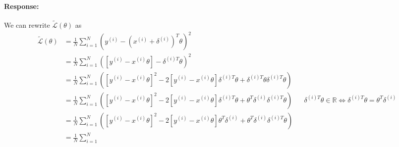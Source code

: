 \documentclass{article}
\newcommand{\R}{\mathbb{R}}
\newenvironment{response}{\begin{responseframe}\vspace{-10pt}\paragraph{Response:}}{\end{responseframe}}
\begin{document}
\begin{enumerate}
\begin{enumerate}
                    \begin{adjustwidth}{-7.7em}{-3em}
                        \begin{response}
                            We can rewrite $\tilde{\mathcal{L}} (\theta)$ as
                            \begin{align*}
                                \tilde{\mathcal{L}} (\theta) 
                            &= \frac{1}{N}
                            \sum^{N}_{i = 1} 
                            \left( y^{(i)} - \left( x^{(i)} + \delta^{(i)} \right)^T \theta \right)^2 \\
                            &= \frac{1}{N} 
                            \sum^{N}_{i = 1} 
                            \left( \left[y^{(i)} - x^{(i)} \theta \right] - \delta^{(i)T} \theta \right)^2 \\
                            &= \frac{1}{N} 
                            \sum^{N}_{i = 1} 
                            \left( 
                                \left[ y^{(i)} - x^{(i)} \theta \right]^2
                                -
                                2\left[ y^{(i)} - x^{(i)} \theta \right] \delta^{(i)T} \theta 
                                + 
                                \delta^{(i)T} \theta \delta^{(i)T} \theta 
                            \right) \\
                            &= \frac{1}{N} 
                            \sum^{N}_{i = 1} 
                            \left( 
                                \left[ y^{(i)} - x^{(i)} \theta \right]^2
                                -
                                2\left[ y^{(i)} - x^{(i)} \theta \right] \delta^{(i)T} \theta 
                                + 
                                \theta^T \delta^{(i)} \delta^{(i)T} \theta 
                            \right) 
                            && \delta^{(i)T} \theta \in \R \iff \delta^{(i)T} \theta = \theta^T \delta^{(i)} \\
                            &= \frac{1}{N} 
                            \sum^{N}_{i = 1} 
                            \left( 
                                \left[ y^{(i)} - x^{(i)} \theta \right]^2
                                -
                                2\left[ y^{(i)} - x^{(i)} \theta \right] \theta^T \delta^{(i)} 
                                + 
                                \theta^T \delta^{(i)} \delta^{(i)T} \theta 
                            \right) \\
                            &= \frac{1}{N} 
                            \sum^{N}_{i = 1} 

\end{align*}
\end{response}
\end{adjustwidth}
\end{enumerate}
\end{enumerate}
\end{document}
